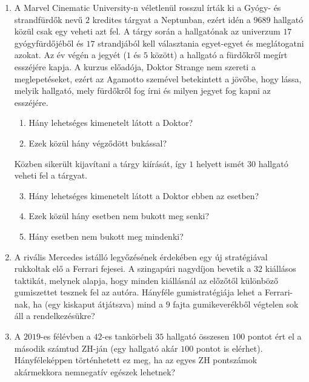 \documentclass[a4paper,12pt]{article}
\begin{document}
    \noindent{}
    \noindent{}
    \begin{enumerate}
        \item A Marvel Cinematic University-n véletlenül rosszul írták ki a Gyógy- és strandfürdők nevű $2$ kredites tárgyat a Neptunban, ezért idén a $9689$ hallgató közül csak egy veheti azt fel. A tárgy során a hallgatónak az univerzum $17$ gyógyfürdőjéből és $17$ strandjából kell választania egyet-egyet és meglátogatni azokat. Az év végén a jegyét ($1$ és $5$ között) a hallgató a fürdőkről megírt esszéjére kapja. A kurzus előadója, Doktor Strange nem szereti a meglepetéseket, ezért az Agamotto szemével betekintett a jövőbe, hogy lássa, melyik hallgató, mely fürdőkről fog írni és milyen jegyet fog kapni az esszéjére.
        \begin{enumerate}
            \item Hány lehetséges kimenetelt látott a Doktor?
            \item Ezek közül hány végződött bukással?
        \end{enumerate}
        Közben sikerült kijavítani a tárgy kiírását, így $1$ helyett ismét $30$ hallgató veheti fel a tárgyat.
        \begin{enumerate}
            \setcounter{enumii}{2}
            \item Hány lehetséges kimenetelt látott a Doktor ebben az esetben?
            \item Ezek közül hány esetben nem bukott meg senki?
            \item Hány esetben nem bukott meg mindenki?
        \end{enumerate}

        \item A rivális Mercedes istálló legyőzésének érdekében egy új stratégiával rukkoltak elő a Ferrari fejesei. A szingapúri nagydíjon bevetik a $32$ kiállásos taktikát, melynek alapja, hogy minden kiállásnál az előzőtől különböző gumiszettet tesznek fel az autóra. Hányféle gumistratégiája lehet a Ferrari-nak, ha (egy kiskaput átjátszva) mind a $9$ fajta gumikeverékből végtelen sok áll a rendelkezésükre?
        
        \item A $2019$-es félévben a $42$-es tankörbeli $35$ hallgató összesen $100$ pontot ért el a második számtud ZH-ján (egy hallgató akár $100$ pontot is elérhet). Hányféleképpen történhetett ez meg, ha az egyes ZH pontszámok akármekkora nemnegatív egészek lehetnek?
        

\end{enumerate}
\end{document}
